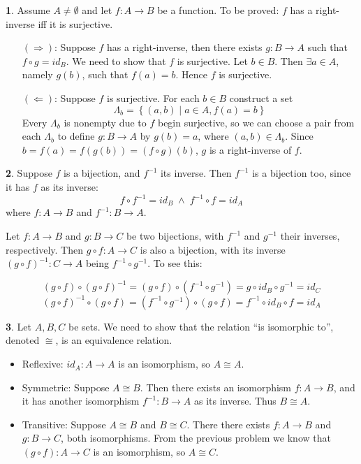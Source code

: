 \documentclass{article}
\theoremstyle{definition}
\newcommand{\AND}{\;\wedge\;}
\newcommand{\set}[1]{\left\{#1\right\}}
\theoremstyle{definition}
\theoremstyle{definition}
\newtheorem{solution-internal}{}[subsection]
\newenvironment{solution}{
  \medskip
  \begin{solution-internal}
}{
  \end{solution-internal}
}
\begin{document}
\begin{solution}
Assume $A \neq \emptyset$ and let $f \colon A \to B$ be a function. To be proved: $f$ has a right-inverse iff it is surjective.
\begin{itemize}
  \item[$(\Rightarrow)$:] Suppose $f$ has a right-inverse, then there exists $g \colon B \to A$ such that $f \circ g = id_B$. We need to show that $f$ is surjective. Let $b \in B$. Then $\exists a \in A$, namely $g(b)$, such that $f(a) = b$. Hence $f$ is surjective.
\item[$(\Leftarrow)$:] Suppose $f$ is surjective. For each $b \in B$ construct a set
\[ \Lambda_b = \set{(a,b) \mid a \in A, f(a) = b} \]
Every $\Lambda_b$ is nonempty due to $f$ begin surjective, so we can choose a
pair from each $\Lambda_b$ to define $g \colon B \to A$ by $g(b) = a$, where
$(a,b) \in \Lambda_b$. Since $b = f(a) = f(g(b)) = (f \circ g)(b)$, $g$ is a
right-inverse of $f$.
\end{itemize}
\end{solution}

\begin{solution}
Suppose $f$ is a bijection, and $f^{-1}$ its inverse. Then $f^{-1}$ is a bijection too, since it has $f$ as its inverse: 
\[f \circ f^{-1} = id_B \AND f^{-1} \circ f = id_A \]
where $f \colon A \to B$ and $f^{-1} \colon B \to A$.
\end{solution}
Let $f\colon A \to B$ and $g\colon B \to C$ be two bijections, with $f^{-1}$
and $g^{-1}$ their inverses, respectively. Then $g \circ f \colon A \to C$ is
also a bijection, with its inverse $(g\circ f)^{-1}\colon C \to A$ being $f^{-1} \circ g^{-1}$. To see this:

\[(g \circ f)\circ {(g\circ f)}^{-1} = (g\circ f) \circ (f^{-1}\circ g^{-1}) = g \circ id_B \circ g^{-1} = id_C \]
\[{(g\circ f)}^{-1}\circ (g \circ f) = (f^{-1}\circ g^{-1}) \circ (g\circ f) = f^{-1} \circ id_B \circ f = id_A \]

\begin{solution}
Let $A,B,C$ be sets. We need to show that the relation ``is isomorphic
to'', denoted $\cong$, is an equivalence relation.
\begin{itemize}
\item Reflexive: $id_A\colon A \to A$ is an isomorphism, so $A\cong A$.
\item Symmetric: Suppose $A \cong B$. Then there exists an isomorphism $f\colon A \to B$, and it has another isomorphism $f^{-1}\colon B \to A$ as its inverse. Thus $B\cong A$.
\item Transitive: Suppose $A\cong B$ and $B\cong C$. There there exists $f\colon A \to B$ and $g\colon B \to C$, both isomorphisms. From the previous problem we know that $(g \circ f)\colon A \to C$ is an isomorphism, so $A \cong C$.
\end{itemize}
\end{solution}
\end{document}
